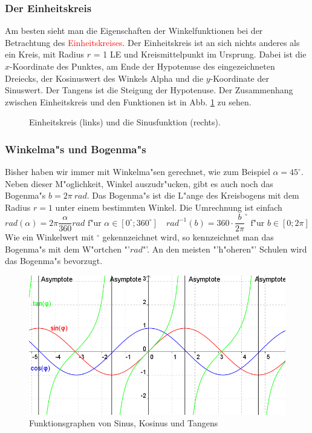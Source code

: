 \subsubsection{Der Einheitskreis}
Am besten sieht man die Eigenschaften der Winkelfunktionen bei der Betrachtung des \textcolor{red}{Einheitskreises}. Der Einheitskreis ist an sich nichts anderes als ein Kreis, mit Radius $r$ = 1 LE und Kreismittelpunkt im Ursprung. Dabei ist die $x$-Koordinate des Punktes, am Ende der Hypotenuse des eingezeichneten Dreiecks, der Kosinuswert des Winkels Alpha und die $y$-Koordinate der Sinuswert. Der Tangens ist die Steigung der Hypotenuse. Der Zusammenhang zwischen Einheitskreis und den Funktionen ist in Abb. \ref{fig:circ} zu sehen.

\begin{figure}[h!]

\caption{Einheitskreis (links) und die Sinusfunktion (rechts).}
\label{fig:circ}
\end{figure}

\subsubsection{Winkelma"s und Bogenma"s}
Bisher haben wir immer mit Winkelma"sen gerechnet, wie zum Beispiel $\alpha = 45^\circ$. Neben dieser M"oglichkeit, Winkel auszudr"ucken, gibt es auch noch das Bogenma"s $b = 2\pi \ rad$. Das Bogenma"s ist die L"ange des Kreisbogens mit dem Radius $r = 1$ unter einem bestimmten Winkel. Die Umrechnung ist einfach
\begin{equation*}
rad(\alpha) = 2\pi \frac{\alpha}{360} rad \text{ f"ur } \alpha \in \left[ 0^\circ;360^\circ \right] \quad rad^{-1}(b) = 360 \cdot {\frac{b}{2\pi}}^\circ \text{ f"ur } b \in \left[0;2\pi\right]
\end{equation*}
Wie ein Winkelwert mit $^\circ$ gekennzeichnet wird, so kennzeichnet man das Bogenma"s mit dem W"ortchen "'$rad$"'. An den meisten "'h"oheren"' Schulen wird das Bogenma"s bevorzugt.

\begin{figure}[h!]
\includegraphics[width = 13 cm, height = 5 cm]{pictures/Winkelfunktionen}
\caption{Funktionsgraphen von Sinus, Kosinus und Tangens}
\end{figure}


